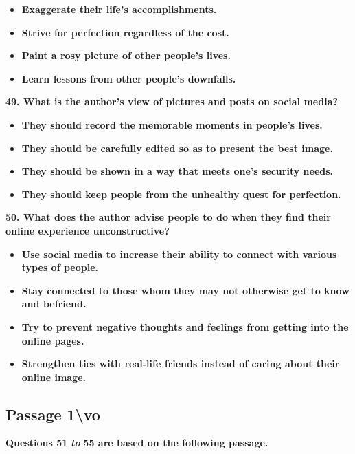 \documentclass[UTF8,11pt]{ctexart}
\begin{document}
\begin{itemize}[leftmargin=2em,itemsep=.2em,topsep=.4em]\item[A.] \textbf{Exaggerate their life's accomplishments.}
\item[B.] \textbf{Strive for perfection regardless of the cost.}
\item[C.] \textbf{Paint a rosy picture of other people's lives.}
\item[D.] \textbf{Learn lessons from other people's downfalls.}
\end{itemize}

\textbf{49. What is the author's view of pictures and posts on social media?}


\begin{itemize}[leftmargin=2em,itemsep=.2em,topsep=.4em]\item[A.] \textbf{They should record the memorable moments in people's lives.}
\item[B.] \textbf{They should be carefully edited so as to present the best image.}
\item[C.] \textbf{They should be shown in a way that meets one's security needs.}
\item[D.] \textbf{They should keep people from the unhealthy quest for perfection.}
\end{itemize}

\textbf{50. What does the author advise people to do when they find their online experience unconstructive?}


\begin{itemize}[leftmargin=2em,itemsep=.2em,topsep=.4em]\item[A.] \textbf{Use social media to increase their ability to connect with various types of people.}
\item[B.] \textbf{Stay connected to those whom they may not otherwise get to know and befriend.}
\item[C.] \textbf{Try to prevent negative thoughts and feelings from getting into the online pages.}
\item[D.] \textbf{Strengthen ties with real-life friends instead of caring about their online image.}
\end{itemize}

\subsection*{\textbf{Passage 1\textbackslash{}vo}}


\textbf{Questions 51 }\textbf{\textit{to }}\textbf{55 are based on the following passage.}
\end{document}
